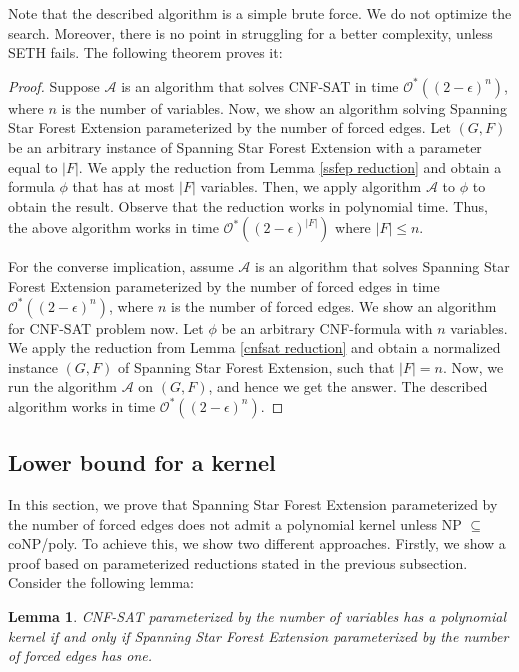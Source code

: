 \documentclass[en]{pracamgr}
\newtheorem{lemma}{Lemma}
\theoremstyle{definition}
\newcommand{\ssfep}{{\sc Spanning Star Forest Extension}}
\newcommand{\cnfsat}{{\sc CNF-SAT}}
\begin{document}
Note that the described algorithm is a simple brute force. We do not optimize the search. Moreover, there is no point in struggling for a better complexity, unless SETH fails. The following theorem proves it:

\thmssfepseth*

\begin{proof}
	Suppose $\mathcal{A}$ is an algorithm that solves \cnfsat{} in time $\mathcal{O}^*((2-\epsilon)^n)$, where $n$ is the number of variables. Now, we show an algorithm solving \ssfep{} parameterized by the number of forced edges. Let $(G,F)$ be an arbitrary instance of \ssfep{} with a parameter equal to $|F|$. We apply the reduction from Lemma \ref{ssfep reduction} and obtain a formula $\phi$ that has at most $|F|$ variables. Then, we apply algorithm $\mathcal{A}$ to $\phi$ to obtain the result. Observe that the reduction works in polynomial time. Thus, the above algorithm works in time $\mathcal{O}^*((2-\epsilon)^|F|)$ where $|F| \leq n$.
	
	For the converse implication, assume $\mathcal{A}$ is an algorithm that solves \ssfep{} parameterized by the number of forced edges in time $\mathcal{O}^*((2-\epsilon)^n)$, where $n$ is the number of forced edges. We show an algorithm for \cnfsat{} problem now. Let $\phi$ be an arbitrary CNF-formula with $n$ variables. We apply the reduction from Lemma \ref{cnfsat reduction} and obtain a normalized instance $(G,F)$ of \ssfep{}, such that $|F|=n$. Now, we run the algorithm $\mathcal{A}$ on $(G,F)$, and hence we get the answer. The described algorithm works in time $\mathcal{O}^*((2-\epsilon)^n)$.
\end{proof}

\subsection{Lower bound for a kernel}

In this section, we prove that \ssfep{} parameterized by the number of forced edges does not admit a polynomial kernel unless NP $\subseteq$ coNP/poly. To achieve this, we show two different approaches. Firstly, we show a proof based on parameterized reductions stated in the previous subsection. Consider the following lemma:

\begin{lemma}\label{kernel}
	\cnfsat{} parameterized by the number of variables has a polynomial kernel if and only if \ssfep{} parameterized by the number of forced edges has one.
\end{lemma}
\end{document}
